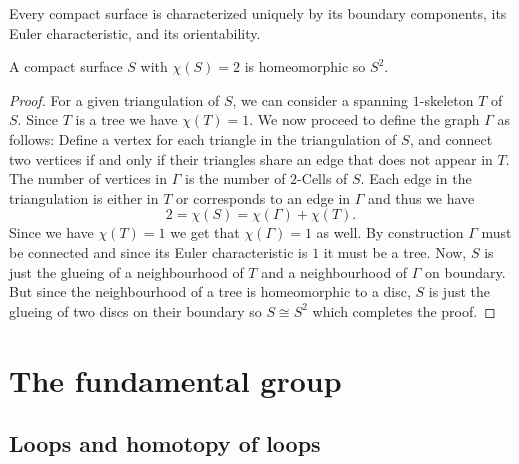 \documentclass[11pt,a4paper]{article}
\begin{document}
\begin{corollary}
  Every compact surface is characterized uniquely by its boundary components,
  its Euler characteristic, and its orientability.
\end{corollary}

\begin{proposition}
  A compact surface $S$ with $\chi(S) = 2$ is homeomorphic so $S^2$.
\end{proposition}
\begin{proof}
  For a given triangulation of $S$, we can consider a spanning $1$-skeleton 
  $T$ of $S$.
  Since $T$ is a tree we have $\chi(T) = 1$.
  We now proceed to define the graph $\Gamma$ as follows:
  Define a vertex for each triangle in the triangulation of $S$,
  and connect two vertices if and only if their triangles share an edge
  that does not appear in $T$.
  The number of vertices in $\Gamma$ is the number of $2$-Cells of $S$.
  Each edge in the triangulation is either in $T$ or corresponds to an
  edge in $\Gamma$ and thus we have
  \[
    2 = \chi(S) = \chi(\Gamma) + \chi(T).
  \]
  Since we have $\chi(T) = 1$ we get that $\chi(\Gamma) = 1$ as well.
  By construction $\Gamma$ must be connected and since its Euler characteristic
  is $1$ it must be a tree.
  Now, $S$ is just the glueing of a neighbourhood of $T$ and a neighbourhood
  of $\Gamma$ on boundary.
  But since the neighbourhood of a tree is homeomorphic to a disc,
  $S$ is just the glueing of two discs on their boundary so
  $S \cong S^2$ which completes the proof.
\end{proof}

\newpage

\section{The fundamental group}

\subsection{Loops and homotopy of loops}
\end{document}
